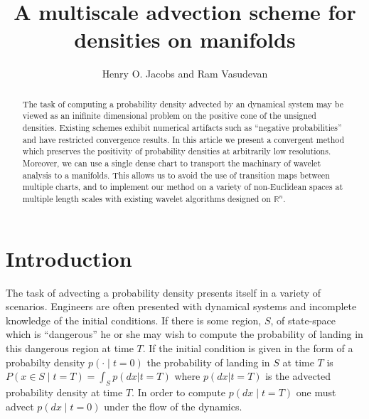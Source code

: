 \documentclass[letterpaper, 12 pt]{amsart}
\title{
  A 
  multiscale
  advection scheme for
  densities on manifolds
}
\author{Henry O. Jacobs and Ram Vasudevan}%
\newcommand{\R}{\mathbb{R}}
\begin{document}
\maketitle

\begin{abstract}
  The task of computing a probability density advected by an 
  dynamical system may be viewed as an inifinite dimensional problem
  on the positive cone of the unsigned densities.
  Existing schemes exhibit numerical artifacts such as
  ``negative probabilities'' and have restricted convergence results.
  In this article we present a convergent method
  which preserves the positivity of probability densities
  at arbitrarily low resolutions.
  Moreover, we can use a single dense chart to transport the machinary of wavelet analysis to a manifolds.
  This allows us to avoid the use of transition maps between multiple charts, and to implement our method on a variety of non-Euclidean spaces at multiple length scales with existing wavelet algorithms designed on $\R^n$.
\end{abstract}


\section{Introduction}
  The task of advecting a probability density presents itself
  in a variety of scenarios.
  Engineers are often presented
  with dynamical systems and incomplete knowledge
  of the initial conditions.
  If there is some region, $S$, of state-space which is ``dangerous''
  he or she may wish to compute the probability of landing
  in this dangerous region at time $T$.
  If the initial condition is given in the form of a
  probabilty density $p(\cdot \mid t=0)$
  the probability of landing in $S$ at time $T$
  is $P( x \in S \mid t = T)  = \int_S p( dx | t=T )$
  where $p(dx|t=T)$ is the advected probability density at time $T$.
  In order to compute $p(dx\mid t=T)$
  one must advect $p(dx\mid t=0)$ under the flow of the dynamics.
\end{document}

